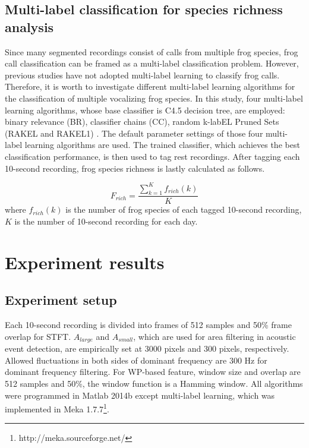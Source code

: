 \subsection{Multi-label classification for species richness analysis} 
Since many segmented recordings consist of calls from multiple frog species, frog call classification can be framed as a multi-label classification problem. However, previous studies have not adopted multi-label learning to classify frog calls. Therefore, it is worth to investigate different multi-label learning algorithms for the classification of multiple vocalizing frog species. In this study, four multi-label learning algorithms, whose base classifier is C4.5 decision tree, are employed: binary relevance (BR), classifier chains (CC), random k-labEL Pruned Sets (RAKEL and RAKEL1) \cite{ZhangReview2014}. The default parameter settings of those four multi-label learning algorithms are used. The trained classifier, which achieves the best classification performance, is then used to tag rest recordings. After tagging each 10-second recording, frog species richness is lastly calculated as follows.

\begin{equation}
F_{rich} = \frac{\sum_{k=1}^{K}f_{rich}(k)}{K}
\end{equation} 
where $f_{rich}(k)$ is the number of frog species of each tagged 10-second recording, $K$ is the number of 10-second recording for each day.




\section{Experiment results}



\subsection{Experiment setup}
Each 10-second recording is divided into frames of 512 samples and 50\% frame overlap for STFT. $A_{large}$ and $A_{small}$, which are used for area filtering in acoustic event detection, are empirically set at 3000 pixels and 300 pixels, respectively. Allowed fluctuations in both sides of dominant frequency are 300 Hz for dominant frequency filtering. For WP-based feature, window size and overlap are 512 samples and 50\%, the window function is a Hamming window. All algorithms were programmed in Matlab 2014b except multi-label learning, which was implemented in Meka 1.7.7\footnote[4]{http://meka.sourceforge.net/}. 




